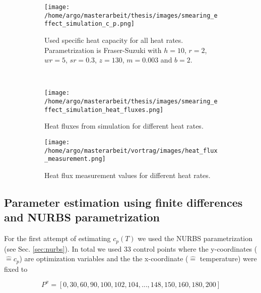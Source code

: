 \documentclass{scrartcl}[12pt, halfparskip]
\begin{document}
\begin{figure}[H]
	\centering
	\begin{subfigure}{0.9\textwidth}
		\centering
		\texttt{[image: /home/argo/masterarbeit/thesis/images/smearing\_effect\_simulation\_c\_p.png]}
		\caption{Used specific heat capacity for all heat rates. Parametrization is Fraser-Suzuki with $h=10$, $r=2$, $wr=5$, $sr=0.3$, $z=130$, $m=0.003$ and $b=2$.}
		\label{fig:smearing_effect_c_p}
	\end{subfigure} \\
	\begin{subfigure}{0.49\textwidth}
		\texttt{[image: /home/argo/masterarbeit/thesis/images/smearing\_effect\_simulation\_heat\_fluxes.png]}
		\caption{Heat fluxes from simulation for different heat rates.}
		\label{fig:smearing_effect_simulation_heat_flux}
	\end{subfigure}
	\begin{subfigure}{0.49\textwidth}
		\texttt{[image: /home/argo/masterarbeit/vortrag/images/heat\_flux\_measurement.png]}
		\caption{Heat flux measurement values for different heat rates.}
		\label{fig:smearing_effect_measurement_heat_flux}
	\end{subfigure}
	\caption{}
\end{figure}



\subsection{Parameter estimation using finite differences and NURBS parametrization}

For the first attempt of estimating $c_p(T)$  we used the NURBS parametrization (see Sec. \ref{sec:nurbs}). In total we used 33 control points where the y-coordinates ($\hat{=} c_p$) are optimization variables and the the x-coordinate ($\hat{=}$ temperature) were fixed to 

\begin{equation}
	P^x = [0, 30, 60, 90, 100, 102, 104, ..., 148, 150, 160, 180, 200]
\end{equation}
\end{document}
